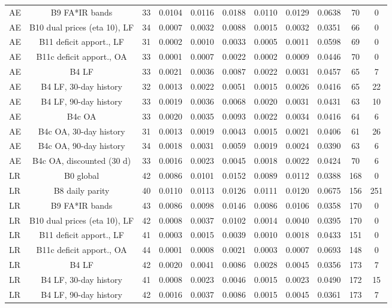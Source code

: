 \documentclass[10pt,onecolumn,letterpaper]{article}
\begin{document}
\begin{table}[!t]
{\begin{tabular}{lcccccccccc}
AE & B9 FA*IR bands & 33 & 0.0104 & 0.0116 & 0.0188 & 0.0110 & 0.0129 & 0.0638 & 70 & 0 \\
AE & B10 dual prices (eta 10), LF & 34 & 0.0007 & 0.0032 & 0.0088 & 0.0015 & 0.0032 & 0.0351 & 66 & 0 \\
AE & B11 deficit apport., LF & 31 & 0.0002 & 0.0010 & 0.0033 & 0.0005 & 0.0011 & 0.0598 & 69 & 0 \\
AE & B11c deficit apport., OA & 33 & 0.0001 & 0.0007 & 0.0022 & 0.0002 & 0.0009 & 0.0446 & 70 & 0 \\
AE & B4 LF & 33 & 0.0021 & 0.0036 & 0.0087 & 0.0022 & 0.0031 & 0.0457 & 65 & 7 \\
AE & B4 LF, 30-day history & 32 & 0.0013 & 0.0022 & 0.0051 & 0.0015 & 0.0026 & 0.0416 & 65 & 22 \\
AE & B4 LF, 90-day history & 33 & 0.0019 & 0.0036 & 0.0068 & 0.0020 & 0.0031 & 0.0431 & 63 & 10 \\
AE & B4c OA & 33 & 0.0020 & 0.0035 & 0.0093 & 0.0022 & 0.0034 & 0.0416 & 64 & 6 \\
AE & B4c OA, 30-day history & 31 & 0.0013 & 0.0019 & 0.0043 & 0.0015 & 0.0021 & 0.0406 & 61 & 26 \\
AE & B4c OA, 90-day history & 34 & 0.0018 & 0.0031 & 0.0059 & 0.0019 & 0.0024 & 0.0390 & 63 & 6 \\
AE & B4c OA, discounted (30 d) & 33 & 0.0016 & 0.0023 & 0.0045 & 0.0018 & 0.0022 & 0.0424 & 70 & 6 \\
LR & B0 global & 42 & 0.0086 & 0.0101 & 0.0152 & 0.0089 & 0.0112 & 0.0388 & 168 & 0 \\
LR & B8 daily parity & 40 & 0.0110 & 0.0113 & 0.0126 & 0.0111 & 0.0120 & 0.0675 & 156 & 251 \\
LR & B9 FA*IR bands & 43 & 0.0086 & 0.0098 & 0.0146 & 0.0086 & 0.0106 & 0.0358 & 170 & 0 \\
LR & B10 dual prices (eta 10), LF & 42 & 0.0008 & 0.0037 & 0.0102 & 0.0014 & 0.0040 & 0.0395 & 170 & 0 \\
LR & B11 deficit apport., LF & 41 & 0.0003 & 0.0015 & 0.0039 & 0.0010 & 0.0018 & 0.0433 & 151 & 0 \\
LR & B11c deficit apport., OA & 44 & 0.0001 & 0.0008 & 0.0021 & 0.0003 & 0.0007 & 0.0693 & 148 & 0 \\
LR & B4 LF & 42 & 0.0020 & 0.0041 & 0.0086 & 0.0028 & 0.0045 & 0.0356 & 173 & 7 \\
LR & B4 LF, 30-day history & 41 & 0.0008 & 0.0023 & 0.0046 & 0.0015 & 0.0023 & 0.0490 & 172 & 15 \\
LR & B4 LF, 90-day history & 42 & 0.0016 & 0.0037 & 0.0086 & 0.0015 & 0.0045 & 0.0361 & 173 & 7 \\

\end{tabular}}
\end{table}
\end{document}
